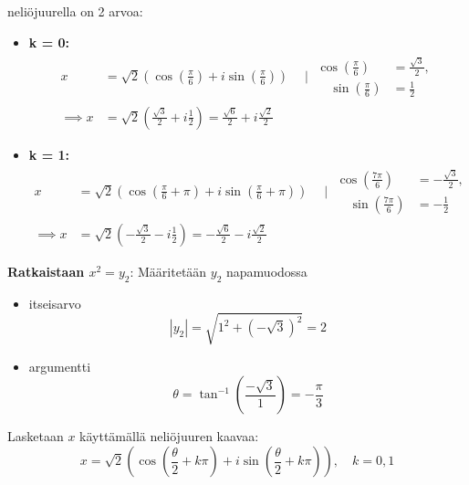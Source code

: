 \documentclass{article}
\begin{document}
\begin{itemize}
    \pagebreak
    neliöjuurella on 2 arvoa:
    \begin{itemize}
        \item \textbf{k = 0:}
        \[
        \begin{aligned}            
            x &= \sqrt{2} \left( \cos\left( \frac{\pi}{6} \right) + i \sin\left( \frac{\pi}{6} \right) \right) \quad \mid
            \begin{aligned}
                \cos\left( \frac{\pi}{6} \right) &= \frac{\sqrt{3}}{2},\\ \quad \sin\left( \frac{\pi}{6} \right) &= \frac{1}{2}
            \end{aligned}\\
            \implies 
            x &= \sqrt{2} \left( \frac{\sqrt{3}}{2} + i \frac{1}{2} \right) = \frac{\sqrt{6}}{2} + i \frac{\sqrt{2}}{2}
        \end{aligned}
        \]
        \item \textbf{k = 1:}
        \[
        \begin{aligned}
            x &= \sqrt{2} \left( \cos\left( \frac{\pi}{6} + \pi \right) + i \sin\left( \frac{\pi}{6} + \pi \right) \right) \quad \mid
            \begin{aligned}
                \cos\left( \frac{7\pi}{6} \right) &= -\frac{\sqrt{3}}{2},\\ \quad \sin\left( \frac{7\pi}{6} \right) &= -\frac{1}{2}
            \end{aligned} \\
            \implies
            x &= \sqrt{2} \left( -\frac{\sqrt{3}}{2} - i \frac{1}{2} \right) = -\frac{\sqrt{6}}{2} - i \frac{\sqrt{2}}{2}
        \end{aligned}
        \]
    \end{itemize}

    \textbf{Ratkaistaan $x^2 = y_2$}:\newline
    Määritetään $y_2$ napamuodossa\newline
    \begin{itemize}
        \item itseisarvo
        \[
            |y_2| = \sqrt{1^2 + (-\sqrt{3})^2} = 2
        \]
        \item argumentti
        \[
            \theta = \tan^{-1}\left( \frac{-\sqrt{3}}{1} \right) = -\frac{\pi}{3}
        \]
    \end{itemize}
    \pagebreak
    Lasketaan $x$ käyttämällä neliöjuuren kaavaa:
    \[
        x = \sqrt{2} \left( \cos\left( \frac{\theta}{2} + k\pi \right) + i \sin\left( \frac{\theta}{2} + k\pi \right) \right), \quad k = 0, 1
    \]




\end{itemize}
\end{document}
